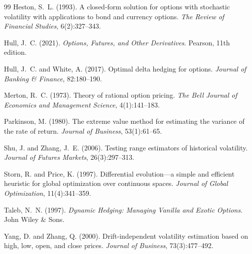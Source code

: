 \documentclass[12pt, letterpaper]{article}
\begin{document}
\begin{thebibliography}{99}
Heston, S.~L. (1993).
\newblock A closed-form solution for options with stochastic volatility with applications to bond and currency options.
\newblock \textit{The Review of Financial Studies}, 6(2):327--343.

Hull, J.~C. (2021).
\newblock \textit{Options, Futures, and Other Derivatives}.
\newblock Pearson, 11th edition.

Hull, J.~C. and White, A. (2017).
\newblock Optimal delta hedging for options.
\newblock \textit{Journal of Banking \& Finance}, 82:180--190.

Merton, R.~C. (1973).
\newblock Theory of rational option pricing.
\newblock \textit{The Bell Journal of Economics and Management Science}, 4(1):141--183.

Parkinson, M. (1980).
\newblock The extreme value method for estimating the variance of the rate of return.
\newblock \textit{Journal of Business}, 53(1):61--65.

Shu, J. and Zhang, J.~E. (2006).
\newblock Testing range estimators of historical volatility.
\newblock \textit{Journal of Futures Markets}, 26(3):297--313.

Storn, R. and Price, K. (1997).
\newblock Differential evolution---a simple and efficient heuristic for global optimization over continuous spaces.
\newblock \textit{Journal of Global Optimization}, 11(4):341--359.

Taleb, N.~N. (1997).
\newblock \textit{Dynamic Hedging: Managing Vanilla and Exotic Options}.
\newblock John Wiley \& Sons.

Yang, D. and Zhang, Q. (2000).
\newblock Drift-independent volatility estimation based on high, low, open, and close prices.
\newblock \textit{Journal of Business}, 73(3):477--492.

\end{thebibliography}
\end{document}
